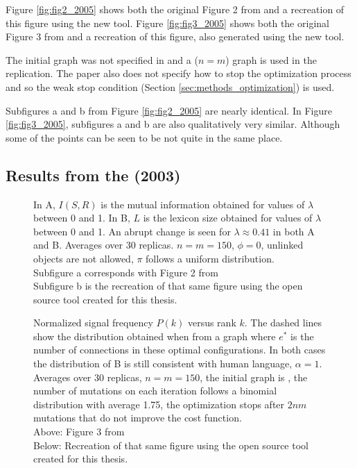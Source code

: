 Figure \ref{fig:fig2_2005} shows both the original Figure 2 from \cite{Ferrer2005a} and a recreation of this figure using the new tool.
Figure \ref{fig:fig3_2005} shows both the original Figure 3 from \cite{Ferrer2005a} and a recreation of this figure, also generated using the new tool.

The initial graph was not specified in \cite{Ferrer2005a} and a  ($n=m$) graph is used in the replication.
The paper also does not specify how to stop the optimization process and so the weak stop condition (Section \ref{sec:methods_optimization}) is used.

Subfigures a and b from Figure \ref{fig:fig2_2005} are nearly identical.
In Figure \ref{fig:fig3_2005}, subfigures a and b are also qualitatively very similar.
Although some of the points can be seen to be not quite in the same place.

\subsection{Results from the \secondmodel{} (2003)}
\label{sec:results_verification_second}

\begin{figure}
  \caption{
    In A, $I(S,R)$ is the mutual information obtained for values of $\lambda$ between 0 and 1.
    In B, $L$ is the lexicon size obtained for values of $\lambda$ between 0 and 1.
    An abrupt change is seen for $\lambda \approx 0.41$ in both A and B.
    Averages over 30 replicas.
    $n=m=150$, $\phi=0$, unlinked objects are not allowed, $\pi$ follows a uniform distribution.\\
    Subfigure a corresponds with Figure 2 from \cite{Ferrer2003a}\\
    Subfigure b is the recreation of that same figure using the open source tool created for this thesis.
  }
  \label{fig:fig2_2003}
\end{figure}

\begin{figure}
  \caption{
    Normalized signal frequency $P(k)$ versus rank $k$.
    The dashed lines show the distribution obtained when from a  graph where $e^*$ is the number of connections in these optimal configurations.
    In both cases the distribution of B is still consistent with human language, $\alpha=1$.
    Averages over 30 replicas, $n=m=150$, the initial graph is , the number of mutations on each iteration follows a binomial distribution with average 1.75, the optimization stops after $2nm$ mutations that do not improve the cost function.\\
    Above: Figure 3 from \cite{Ferrer2003a}\\
    Below: Recreation of that same figure using the open source tool created for this thesis.
  }
  \label{fig:fig3_2003}
\end{figure}

